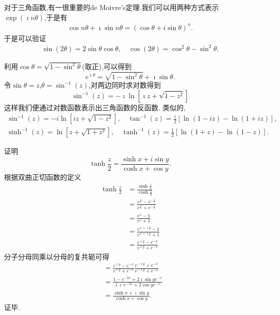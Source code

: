 对于三角函数,有一很重要的de Moivre's定理.我们可以用两种方式表示$\exp(\imath n \theta)$,于是有
\begin{align}
    \cos n \theta + \imath \sin n\theta = (\cos \theta + i \sin \theta)^n  .
\end{align}
于是可以验证
\begin{align}
    \sin(2\theta) = 2\sin\theta \cos\theta, \quad \cos (2\theta) = \cos^2\theta - \sin^2\theta .
\end{align}

利用$\cos \theta = \sqrt{1 - \sin ^2 \theta }$(取正),可以得到
\begin{equation}
  e^{\imath \theta} = \sqrt{ 1 - \sin ^2 \theta } + \imath \sin \theta .  
\end{equation} 
令$\sin \theta = z$,$\theta = \sin^{-1} (z)$,对两边同时求对数得到
\begin{equation}
    \sin^{-1} (z) = -\imath \ln \left[ \imath z + \sqrt{1-z^2} \right]
\end{equation}
这样我们便通过对数函数表示出三角函数的反函数.
类似的,
\begin{equation}
    \begin{array}{cc}
    \sin ^{-1}(z)=-i \ln \left[i z+\sqrt{1-z^2}\right], \quad \tan ^{-1}(z)=\frac{i}{2}[\ln (1-i z)-\ln (1+i z)], \\
    \sinh ^{-1}(z)=\ln \left[z+\sqrt{1+z^2}\right], \quad \tanh ^{-1}(z)=\frac{1}{2}[\ln (1+z)-\ln (1-z)] .
    \end{array}
\end{equation}

\begin{examplebox}{证明
    \begin{equation*}\tanh \frac{z}{2}=\frac{\sinh x+i \sin y}{\cosh x+\cos y} .  
    \end{equation*}
}
根据双曲正切函数的定义
\begin{align*}
    \tanh \frac{z}{2} &= \frac{\sinh \frac{z}{2} }{ \cosh \frac{z}{2}}
    \\
    &= \frac{e^{\frac{z}{2}} - e^{-\frac{z}{2}}}{e^{\frac{z}{2}} + e^{-\frac{z}{2}}}
    \\
    &= \frac{e^{z} - 1}{e^{z} + 1} 
    \\
    &= \frac{e^{x+\imath y } -1 } { e^{x + \imath y } + 1}
    \\
    &=\frac{e^{\imath y } -e^{-x} } { e^{\imath y } + e^{-x}}
\end{align*}   
分子分母同乘以分母的复共轭可得
\begin{align*}
    &=\frac{e^{\imath y } -e^{-x} } { e^{\imath y } + e^{-x}} \frac{e^{-\imath y } + e^{-x}} { e^{-\imath y } + e^{-x}}
    \\
    &=\frac{ 1 - e^{-2x} + 2 \imath \sin y e^{-x}}{1+ e^{-2x} + 2 \cos y e^{-x} }
    \\
    &= \frac{\sinh x + \imath \sin y} {\cosh x + \cos y} .  
\end{align*}
证毕.
\end{examplebox}

